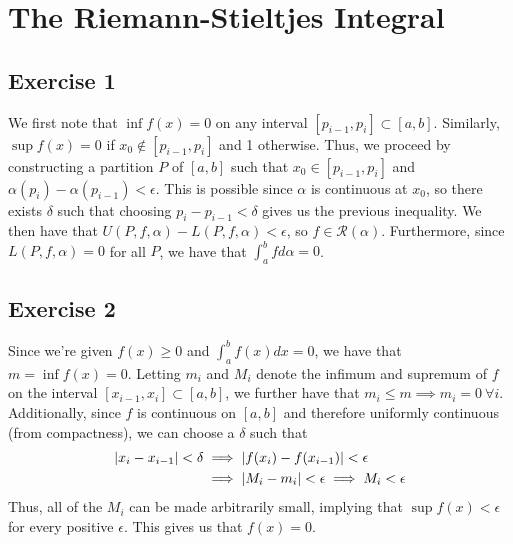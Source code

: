 \section{The Riemann-Stieltjes Integral}

\subsection{Exercise 1}
We first note that $\inf{f(x)} = 0$ on any interval $ [p_{i-1}, p_i] \subset [a, b]$. Similarly,
$\sup{f(x)} = 0$ if $x_0 \notin [p_{i-1}, p_i]$ and 1 otherwise. Thus, we proceed by constructing a
partition $P$ of $[a, b]$ such that $x_0 \in [p_{i-1}, p_i]$ and $\alpha(p_i) - \alpha(p_{i-1}) < \epsilon$.
This is possible since $\alpha$ is continuous at $x_0$, so there exists $\delta$ such that choosing
$p_i - p_{i-1} < \delta$ gives us the previous inequality. We then have that  
$U(P, f, \alpha) - L(P, f, \alpha) < \epsilon$, so $f \in \mathscr{R}(\alpha)$. Furthermore, since
$L(P, f, \alpha) = 0$ for all $P$, we have that $\int_{a}^{b} f d\alpha = 0$.

\subsection{Exercise 2}
Since we're given $f(x) \geq 0$ and $\int_{a}^{b} f(x) dx = 0$, we have that $m = \inf{f(x)} = 0$. Letting
$m_i$ and $M_i$ denote the infimum and supremum of $f$ on the interval $[x_{i-1}, x_i] \subset [a, b]$,
we further have that $m_i \leq m \implies m_i = 0 \: \forall i$. Additionally, since $f$ is continuous
on $[a, b]$ and therefore uniformly continuous (from compactness), we can choose a $\delta$ such that
\begin{align*}
        \abs{x_i - x_{i-1}} < \delta &\implies \abs{f(x_i) - f(x_{i-1})} < \epsilon \\
                                     &\implies \abs{M_i - m_i} < \epsilon \implies M_i < \epsilon
\end{align*}
Thus, all of the $M_i$ can be made arbitrarily small, implying that $\sup{f(x)} < \epsilon$ for every 
positive $\epsilon$. This gives us that $f(x) = 0$.
